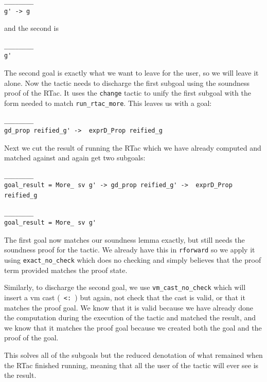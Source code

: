 \documentclass{puthesis}
\begin{document}
\begin{lstlisting}
________
g' -> g
\end{lstlisting}

and the second is

\begin{lstlisting}
________
g'
\end{lstlisting}

The second goal is exactly what we want to leave for the user, so we
will leave it alone. Now the tactic needs to discharge the first
subgoal using the soundness proof of the RTac. It uses the
\lstinline|change| tactic to unify the first subgoal with the form
needed to match \lstinline|run_rtac_more|. This leaves us with a goal:

\begin{lstlisting}
________
gd_prop reified_g' ->  exprD_Prop reified_g
\end{lstlisting}

Next we cut the result of running the RTac which we have already 
computed and matched against and again get two subgoals:

\begin{lstlisting}
________
goal_result = More_ sv g' -> gd_prop reified_g' ->  exprD_Prop reified_g
\end{lstlisting}

\begin{lstlisting}
________
goal_result = More_ sv g'
\end{lstlisting}

The first goal now matches our soundness lemma exactly, but still
needs the soundness proof for the tactic. We already have this in
\lstinline|rforward| so we apply it using \lstinline|exact_no_check| 
which does no checking and simply believes that the proof term provided
matches the proof state.

Similarly, to discharge the second goal, we use 
\lstinline|vm_cast_no_check| which will insert a vm cast (\lstinline| <: |)
but again, not check that the cast is valid, or that it matches the proof
goal. We know that it is valid because we have already done the computation
during the execution of the tactic and matched the result, and
we know that it matches the proof goal because we created both the
goal and the proof of the goal.

This solves all of the subgoals but the reduced denotation of what
remained when the RTac finished running, meaning that all the user
of the tactic will ever see is the result. 
\end{document}
